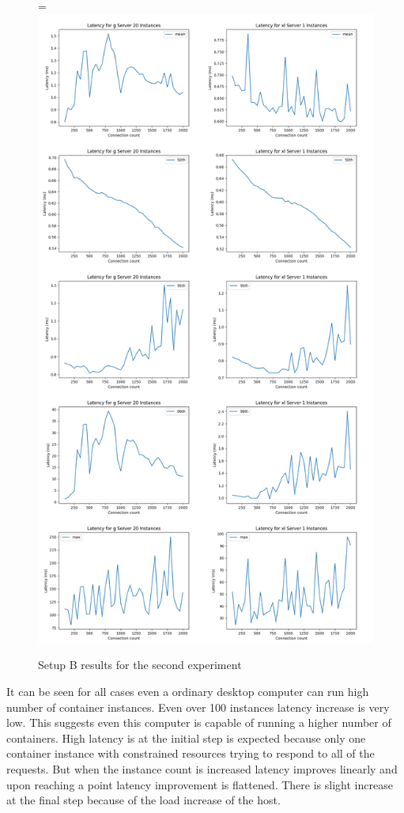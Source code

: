 \documentclass[12pt,oneandhalf,chaparabic,ceng,ms,eng,oneside,pntc]{gsufbe}
\makeatletter
\let\old@includegraphics\includegraphics
\renewcommand{\includegraphics}[2][,]{%
  \setbox9=\hbox{\old@includegraphics[#1]{#2}}%
  \ifdim\wd9>\textwidth
    \old@includegraphics[#1,width=\textwidth]{#2}%
  \else
    \old@includegraphics[#1]{#2}%
  \fi%
}
\makeatother
\begin{document}
\begin{figure}
\centering
\includegraphics[]{1vs20.png}
\caption{Setup B results for the second experiment}
\label{fig:1vs20}
\end{figure}

It can be seen for all cases even a ordinary desktop computer can run high number of container
instances.  Even over 100 instances latency increase is very low.  This suggests even this computer is
capable of running a higher number of containers.  High latency is at the initial step is expected 
because only one container instance with constrained resources trying to respond to all of the requests.
But when
the instance count is increased latency improves linearly and upon reaching a point latency improvement
is flattened.  There is slight increase at the final step because of the load increase of the host.
\end{document}
